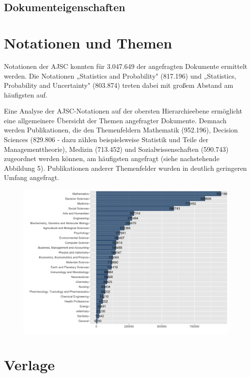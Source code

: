 \documentclass[a4paper,
fontsize=11pt,
oneside,
numbers=noperiodatend,
parskip=half-,
bibliography=totoc,
final
]{scrartcl}
\begin{document}
\hypertarget{dokumenteigenschaften}{%
\subsection{Dokumenteigenschaften}\label{dokumenteigenschaften}}

\hypertarget{notationen-und-themen}{%
\section{Notationen und Themen}\label{notationen-und-themen}}

Notationen der AJSC konnten für 3.047.649 der angefragten Dokumente
ermittelt werden. Die Notationen „Statistics and Probability" (817.196)
und „Statistics, Probability and Uncertainty" (803.874) treten dabei mit
großem Abstand am häufigsten auf.

Eine Analyse der AJSC-Notationen auf der obersten Hierarchieebene
ermöglicht eine allgemeinere Übersicht der Themen angefragter Dokumente.
Demnach werden Publikationen, die den Themenfeldern Mathematik
(952.196), Decision Sciences (829.806 - dazu zählen beispielsweise
Statistik und Teile der Managementtheorie), Medizin (713.452) und
Sozialwissenschaften (590.743) zugeordnet werden können, am häufigsten
angefragt (siehe nachstehende Abbildung 5). Publikationen anderer
Themenfelder wurden in deutlich geringeren Umfang angefragt.

\begin{figure}
\centering
\includegraphics{images/Downloads_Themen.png}
\end{figure}

\hypertarget{verlage}{%
\section{Verlage}\label{verlage}}
\end{document}
